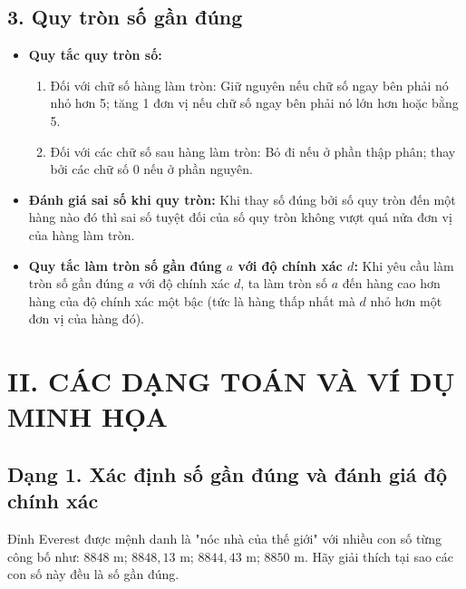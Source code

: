 \subsection*{3. Quy tròn số gần đúng}
\begin{itemize}
	\item \textbf{Quy tắc quy tròn số:}
	\begin{enumerate}
		\item Đối với chữ số hàng làm tròn: Giữ nguyên nếu chữ số ngay bên phải nó nhỏ hơn 5; tăng 1 đơn vị nếu chữ số ngay bên phải nó lớn hơn hoặc bằng 5.
		\item Đối với các chữ số sau hàng làm tròn: Bỏ đi nếu ở phần thập phân; thay bởi các chữ số 0 nếu ở phần nguyên.
	\end{enumerate}
	\item \textbf{Đánh giá sai số khi quy tròn:} Khi thay số đúng bởi số quy tròn đến một hàng nào đó thì sai số tuyệt đối của số quy tròn không vượt quá nửa đơn vị của hàng làm tròn.
	\item \textbf{Quy tắc làm tròn số gần đúng $a$ với độ chính xác $d$:} Khi yêu cầu làm tròn số gần đúng $a$ với độ chính xác $d$, ta làm tròn số $a$ đến hàng cao hơn hàng của độ chính xác một bậc (tức là hàng thấp nhất mà $d$ nhỏ hơn một đơn vị của hàng đó).
\end{itemize}

\vspace{0.3cm}
\section*{II. CÁC DẠNG TOÁN VÀ VÍ DỤ MINH HỌA}

\subsection*{Dạng 1. Xác định số gần đúng và đánh giá độ chính xác}

\begin{vd}
	Đỉnh Everest được mệnh danh là "nóc nhà của thế giới" với nhiều con số từng công bố như: $8848\text{ m}$; $8848{,}13\text{ m}$; $8844{,}43\text{ m}$; $8850\text{ m}$. Hãy giải thích tại sao các con số này đều là số gần đúng.
\end{vd}

